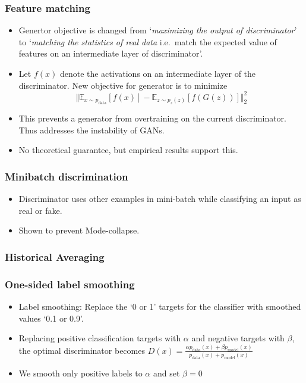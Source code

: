 \documentclass{article}
\begin{document}
    \subsubsection{Feature matching}\label{subsubsec:Improved_Techniques_for_Training_GANs:feature-matching}
    \begin{itemize}
        \item Genertor objective is changed from `\textit{maximizing the output of discriminator}' to `\textit{matching the statistics of real data} i.e.\ match the expected value of features on an intermediate layer of discriminator'.
        \item Let $f(x)$ denote the activations on an intermediate layer of the discriminator.
        New objective for generator is to minimize
        \[\Vert \mathbb{E}_{x \sim p_{\textrm{data}}}[f(x)] - \mathbb{E}_{z \sim p_z(z)}[f(G(z))] \Vert_2^2\]
        \item This prevents a generator from overtraining on the current discriminator.
        Thus addresses the instability of GANs.
        \item No theoretical guarantee, but empirical results support this.
    \end{itemize}

    \subsubsection{Minibatch discrimination}\label{subsubsec:Improved_Techniques_for_Training_GANs:minibatch-discrimination}
    \begin{itemize}
        \item Discriminator uses other examples in mini-batch while classifying an input as real or fake.
        \item Shown to prevent Mode-collapse.
    \end{itemize}

    \subsubsection{Historical Averaging}\label{subsubsec:Improved_Techniques_for_Training_GANs:historical-averaging}

    \subsubsection{One-sided label smoothing}\label{subsubsec:Improved_Techniques_for_Training_GANs:one-sided-label-smoothing}
    \begin{itemize}
        \item Label smoothing: Replace the `0 or 1' targets for the classifier with smoothed values `0.1 or 0.9'.
        \item Replacing positive classification targets with $\alpha$ and negative targets with $\beta$, the optimal discriminator becomes $D(x) = \frac{\alpha p_{\textrm{data}}(x) + \beta p_{\textrm{model}}(x)}{p_{\textrm{data}}(x) + p_{\textrm{model}}(x)}$
        \item We smooth only positive labels to $\alpha$ and set $\beta = 0$
    \end{itemize}
\end{document}
